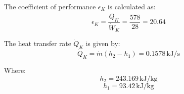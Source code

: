 The coefficient of performance \( \epsilon_K \) is calculated as:  
\[
\epsilon_K = \frac{\dot{Q}_K}{\dot{W}_K} = \frac{578}{28} = 20.64
\]

The heat transfer rate \( \dot{Q}_K \) is given by:  
\[
\dot{Q}_K = \dot{m} (h_2 - h_1) = 0.1578 \, \text{kJ/s}
\]

Where:  
\[
h_2 = 243.169 \, \text{kJ/kg}
\]  
\[
h_1 = 93.42 \, \text{kJ/kg}
\]